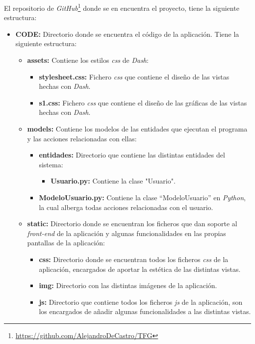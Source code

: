 El repositorio de \textit{GitHub}\footnote{\url{https://github.com/AlejandroDeCastro/TFG}} donde se en encuentra el proyecto, tiene la siguiente estructura:
\begin{itemize}
    \item \textbf{CODE:} Directorio donde se encuentra el código de la aplicación. Tiene la siguiente estructura:
    \begin{itemize}
        \item \textbf{assets:} Contiene los estilos \textit{css} de \textit{Dash}:
        \begin{itemize}
            \item \textbf{stylesheet.css:} Fichero \textit{css} que contiene el diseño de las vistas hechas con \textit{Dash}.
            \item \textbf{s1.css:} Fichero \textit{css} que contiene el diseño de las gráficas de las vistas hechas con \textit{Dash}.
        \end{itemize}
        \item \textbf{models:} Contiene los modelos de las entidades que ejecutan el programa y las acciones relacionadas con ellas:
        \begin{itemize}
            \item \textbf{entidades:} Directorio que contiene las distintas entidades del sistema:
            \begin{itemize}
                \item \textbf{Usuario.py:} Contiene la clase "Usuario". 
            \end{itemize}
            \item \textbf{ModeloUsuario.py:} Contiene la clase ``ModeloUsuario'' en \textit{Python}, la cual alberga todas acciones relacionadas con el usuario.
        \end{itemize}
        \item \textbf{static:} Directorio donde se encuentran los ficheros que dan soporte al \textit{front-end} de la aplicación y algunas funcionalidades en las propias pantallas de la aplicación:
        \begin{itemize}
            \item \textbf{css:} Directorio donde se encuentran todos los ficheros \textit{css} de la aplicación, encargados de aportar la estética de las distintas vistas.
            \item \textbf{img:} Directorio con las distintas imágenes de la aplicación.
            \item \textbf{js:} Directorio que contiene todos los ficheros \textit{js} de la aplicación, son los encargados de añadir algunas funcionalidades a las distintas vistas.

\end{itemize}
\end{itemize}
\end{itemize}
